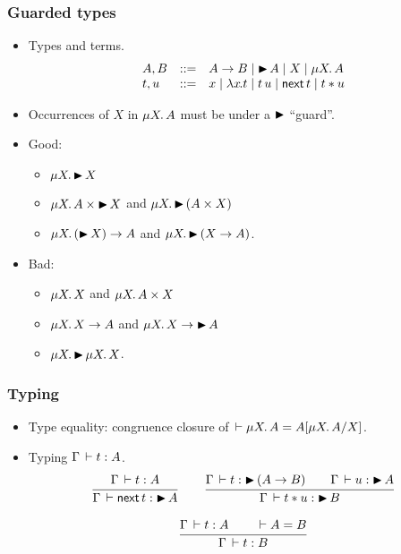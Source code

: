 \documentclass[t]{beamer}
\newcommand{\nex}{\tnext\,}
\newcommand{\muT}[2]{\mu {#1} \hspace{-0.1em} . \,  {#2}}
\begin{document}
\begin{frame}%
  \frametitle{Guarded types}
  \begin{itemize}
  \item Types and terms.
\[
\begin{array}{lrl}
  A,B & ::= &  A \to B \mid \later A \mid X \mid \muT X A
\\
  t,u & ::= & x \mid \lam x t \mid t \, u \mid \nex t \mid t \ast u
\end{array}
\vspace{-1.5ex}
\]
  \item Occurrences of $X$ in $\muT X A$ must be
    under a $\mathord{\blacktriangleright}$ ``\alert{guard}''.
  \item Good:
    \begin{itemize}
    \item $\muT X {\later X}$
    \item $\muT X {A \times \later X}$ and $\muT X {\later (A \times X)}$
    \item $\muT X {(\later X) \to A}$ and $\muT X {\later (X \to A)}$.
    \end{itemize}
  \item Bad:
    \begin{itemize}
    \item $\muT X X$ and $\muT X {A \times X}$
    \item $\muT X {X \to A}$ and $\muT X {X \to \later A}$
    \item $\muT X {\later \muT X X}$.
    \end{itemize}
  \end{itemize}
\end{frame}

\begin{frame}%
  \frametitle{Typing}
  \begin{itemize}
  \item Type equality: congruence closure of $\der \muT X A = \subst
    {\muT X A} X A$.
  \item Typing $\Gamma \,\vdash t : A$.
\begin{gather*}
   \ru{\Gamma \der t : A}{\Gamma \der \nex t : \later A}
\qquad
   \ru{\Gamma \der t : \later(A \to B) \qquad
       \Gamma \der u : \later A
     }{\Gamma \der t \ast u : \later B}
\\[2ex]
  \ru{\Gamma \der t : A \qquad \der A = B
    }{\Gamma \der t : B}
\end{gather*}
  \end{itemize}
\end{frame}
\end{document}
